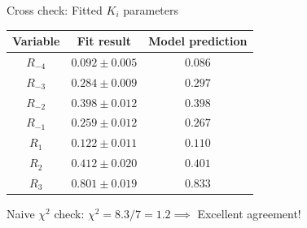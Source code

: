 \documentclass{beamer}
\begin{document}
\begin{frame}{Cross check: Fitted $K_i$ parameters}
  \centering
  \def\arraystretch{1.2}%
  \begin{tabular}{ccc}
    \hline
    Variable   & Fit result        & Model prediction \\
    \hline
    $R_{-4}$   & $0.092 \pm 0.005$ & $0.086$    \\
    $R_{-3}$   & $0.284 \pm 0.009$ & $0.297$    \\
    $R_{-2}$   & $0.398 \pm 0.012$ & $0.398$    \\
    $R_{-1}$   & $0.259 \pm 0.012$ & $0.267$    \\
    $R_1$      & $0.122 \pm 0.011$ & $0.110$    \\
    $R_2$      & $0.412 \pm 0.020$ & $0.401$    \\
    $R_3$      & $0.801 \pm 0.019$ & $0.833$    \\
    \hline
  \end{tabular}
  \begin{center}
    Naive $\chi^2$ check: $\chi^2 = 8.3/7=1.2\implies$ Excellent agreement!
  \end{center}
\end{frame}
\end{document}
